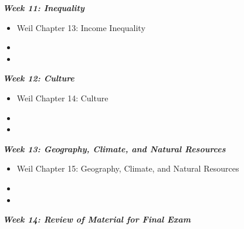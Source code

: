 \documentclass[11pt]{article}
\begin{document}
\noindent \textbf{\textit{Week 11: Inequality}}
\begin{itemize}
\item Weil Chapter 13: Income Inequality
\smallskip
\item {}
\smallskip
\item {}
\end{itemize}
\bigskip

\noindent \textbf{\textit{Week 12: Culture}}
\begin{itemize}
\item Weil Chapter 14: Culture
\smallskip
\item {}
\smallskip
\item {}
\end{itemize}
\bigskip

\noindent \textbf{\textit{Week 13: Geography, Climate, and Natural Resources}}
\begin{itemize}
\item Weil Chapter 15: Geography, Climate, and Natural Resources
\smallskip
\item {}
\smallskip
\item {}
\end{itemize}
\bigskip

\noindent \textbf{\textit{Week 14: Review of Material for Final Exam}}
\bigskip

\newpage

{
}
\end{document}
